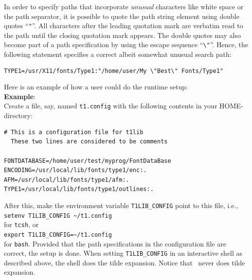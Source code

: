 In order to specify paths that incorporate {\em unusual} characters like white
space or the path separator, it is possible to quote the path string element
using double quotes ``\verb+"+''. All characters after the leading quotation
mark are verbatim read to the path until the closing quotation mark
appears. The double quotes may also become part of a path 
specification by using the escape sequence ``\verb+\"+''. Hence, the following
statement specifies a correct albeit somewhat unusual search path:
\begin{verbatim}
TYPE1=/usr/X11/fonts/Type1:"/home/user/My \"Best\" Fonts/Type1"
\end{verbatim}

Here is an example of how a user could do the runtime setup: \\[2mm]
{\bfseries Example}: \\
Create a file, say, named \verb+t1.config+ with the following
contents in your HOME-directory:
\begin{verbatim}
# This is a configuration file for t1lib
  These two lines are considered to be comments

FONTDATABASE=/home/user/test/myprog/FontDataBase
ENCODING=/usr/local/lib/fonts/type1/enc:.
AFM=/usr/local/lib/fonts/type1/afm:.
TYPE1=/usr/local/lib/fonts/type1/outlines:.
\end{verbatim}
After this, make the environment variable \verb+T1LIB_CONFIG+  point
to this file, i.e., \\
\verb+setenv T1LIB_CONFIG ~/t1.config+\\
 for \verb+tcsh+, or\\ 
\verb+export T1LIB_CONFIG=~/t1.config+\\
for \verb+bash+. Provided that the path specifications in the
configuration file are correct, the setup is done. When setting
\verb+T1LIB_CONFIG+ in an interactive shell as described above, the shell does
the tilde expansion. Notice that \tonelib\ never does tilde expansion.


